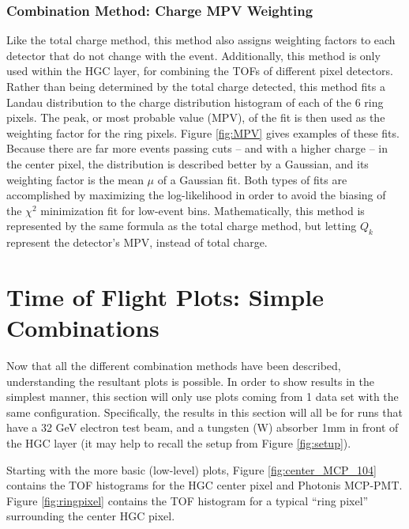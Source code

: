 \documentclass[twocolumn,aps,prd,reprint,superscriptaddress,floatfix]{revtex4-1}
\begin{document}
\subsubsection{Combination Method: Charge MPV Weighting}
Like the total charge method, this method also assigns weighting factors to each detector that do not change with the event. 
Additionally, this method is only used within the HGC layer, for combining the TOFs of different pixel detectors. 
Rather than being determined by the total charge detected, this method fits a Landau distribution to the charge distribution histogram of each of the 6 ring pixels.
The peak, or most probable value (MPV), of the fit is then used as the weighting factor for the ring pixels. 
Figure \ref{fig:MPV} gives examples of these fits.
Because there are far more events passing cuts -- and with a higher charge -- in the center pixel, the distribution is described better by a Gaussian, and its weighting factor is the mean $\mu$ of a Gaussian fit.
Both types of fits are accomplished by maximizing the log-likelihood in order to avoid the biasing of the $\chi^2$ minimization fit for low-event bins.
Mathematically, this method is represented by the same formula as the total charge method, but letting $Q_k$ represent the detector's MPV, instead of total charge.


\section{Time of Flight Plots: Simple Combinations}
Now that all the different combination methods have been described, understanding the resultant plots is possible. 
In order to show results in the simplest manner, this section will only use plots coming from 1 data set with the same configuration. 
Specifically, the results in this section will all be for runs that have a 32 GeV electron test beam, and a tungsten (W) absorber 1mm in front of the HGC layer (it may help to recall the setup from Figure \ref{fig:setup}).

Starting with the more basic (low-level) plots, Figure \ref{fig:center_MCP_104} contains the TOF histograms for the HGC center pixel and Photonis MCP-PMT.
Figure \ref{fig:ringpixel} contains the TOF histogram for a typical ``ring pixel'' surrounding the center HGC pixel.
\end{document}
